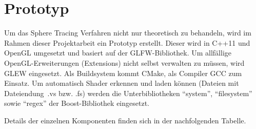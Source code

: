 
\chapter{Prototyp}
\label{chap:prototype}

Um das Sphere Tracing Verfahren nicht nur theoretisch zu behandeln, wird im
Rahmen dieser Projektarbeit ein Prototyp erstellt.  Dieser wird in C++11 und
OpenGL umgesetzt und basiert auf der GLFW-Bibliothek. Um allfällige
OpenGL-Erweiterungen (Extensions) nicht selbst verwalten zu müssen, wird GLEW
eingesetzt. Als Buildsystem kommt CMake, als Compiler GCC zum Einsatz. Um
automatisch Shader erkennen und laden können (Dateien mit Dateiendung~.vs bzw.
.fs) werden die Unterbibliotheken ``system'',  ``filesystem'' sowie
``regex'' der Boost-Bibliothek eingesetzt.

Details der einzelnen Komponenten finden sich in der nachfolgenden Tabelle.


